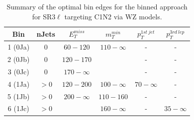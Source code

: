 \documentclass[11pt, oneside]{article}
\begin{document}
\begin{table}[H]
\begin{center}
\begin{tabular}{c | c | c | c | c | c}
\toprule
Bin & nJets & $E_{T}^{miss}$ & $m_{T}^{min}$ & $p_{T}^{1st\ jet}$ & $p_{T}^{3rd\ lep}$ \\
\hline \hline
1 (0Ja) & $0$ & $60-120$ & $110-\infty$ & - & - \\
\hline
2 (0Jb) & $0$ & $120-170$ & & - & - \\
\hline
3 (0Jc) & $0$ & $170-\infty$ & & - & - \\
\hline \hline
4 (1Ja) & $>0$ & $120-200$ & $100-\infty$ & $70-\infty$ & - \\
\hline
5 (1Jb) & $>0$ & $200-\infty$ & $110-160$ & - & - \\
\hline
6 (1Jc) & $>0$ & & $160-\infty$ & - & $35 - \infty$ \\
\bottomrule
\end{tabular}
\caption{Summary of the optimal bin edges for the binned approach for SR3$\ell$ targeting C1N2 via WZ models.}
\end{center}
\end{table}
\end{document}
